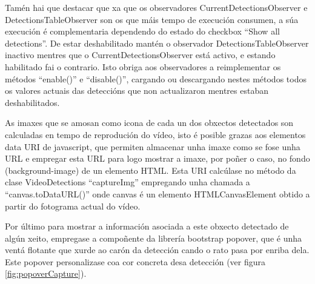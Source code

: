        Tamén hai que destacar que xa que os observadores CurrentDetectionsObserver e 
        DetectionsTableObserver son os que máis tempo de execución consumen, a súa execución é 
        complementaria dependendo do estado do checkbox ``Show all detections''. De estar
        deshabilitado mantén o observador DetectionsTableObserver inactivo mentres que o 
        CurrentDetectionsObserver está activo, e estando habilitado fai o contrario. Isto obriga aos
        observadores a reimplementar os métodos ``enable()'' e ``disable()'', cargando ou
        descargando nestes métodos todos os valores actuais das deteccións que non actualizaron mentres
        estaban deshabilitados.
        
        As imaxes que se amosan como icona de cada un dos obxectos detectados son calculadas en tempo de
        reprodución do vídeo, isto é posible grazas aos elementos data URI\cite{data-uris} de javascript,
        que permiten almacenar unha imaxe como se fose unha URL e empregar esta URL para logo mostrar a 
        imaxe, por poñer o caso, no fondo (background-image) de un elemento HTML. Esta URI calcúlase 
        no método da clase VideoDetections ``captureImg'' empregando unha chamada a ``canvas.toDataURL()''
        onde canvas é un elemento HTMLCanvasElement obtido a partir do fotograma actual do vídeo.
        
        Por último para mostrar a información asociada a este obxecto detectado de algún xeito, 
        empregase a compoñente da librería bootstrap popover, que é unha ventá flotante que xurde ao
        carón da detección cando o rato pasa por enriba dela. Este popover personalizase coa cor 
        concreta desa detección (ver figura \ref{fig:popoverCapture}).
        
